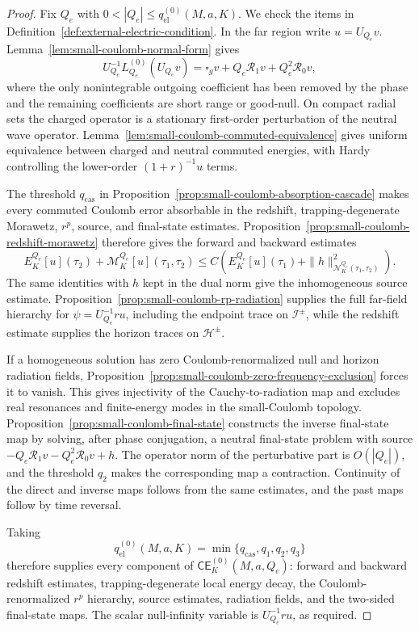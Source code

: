 \documentclass[11pt]{article}
\numberwithin{equation}{section}
\theoremstyle{plain}
\theoremstyle{definition}
\theoremstyle{remark}
\newcommand{\CElec}{\mathsf{CE}}
\begin{document}
\begin{proof}
Fix \(Q_e\) with \(0<|Q_e|\le q^{(0)}_{\mathrm{el}}(M,a,K)\).  We check the items in Definition~\ref{def:external-electric-condition}.  In the far region write \(u=U_{Q_e}v\).  Lemma~\ref{lem:small-coulomb-normal-form} gives
\begin{equation}
 U_{Q_e}^{-1}L_{Q_e}^{(0)}(U_{Q_e}v)=\square_gv+Q_e\mathcal R_1v+Q_e^2\mathcal R_0v,
\end{equation}
where the only nonintegrable outgoing coefficient has been removed by the phase and the remaining coefficients are short range or good-null.  On compact radial sets the charged operator is a stationary first-order perturbation of the neutral wave operator.  Lemma~\ref{lem:small-coulomb-commuted-equivalence} gives uniform equivalence between charged and neutral commuted energies, with Hardy controlling the lower-order \((1+r)^{-1}u\) terms.

The threshold \(q_{\mathrm{cas}}\) in Proposition~\ref{prop:small-coulomb-absorption-cascade} makes every commuted Coulomb error absorbable in the redshift, trapping-degenerate Morawetz, \(r^p\), source, and final-state estimates.  Proposition~\ref{prop:small-coulomb-redshift-morawetz} therefore gives the forward and backward estimates
\begin{equation}
 E^{Q_e}_K[u](\tau_2)+\mathcal M^{Q_e}_K[u](\tau_1,\tau_2)
 \le C\left(E^{Q_e}_K[u](\tau_1)+\|h\|_{\mathcal N^{Q_e}_K(\tau_1,\tau_2)}^2\right).
\end{equation}
The same identities with \(h\) kept in the dual norm give the inhomogeneous source estimate.  Proposition~\ref{prop:small-coulomb-rp-radiation} supplies the full far-field hierarchy for \(\psi=U_{Q_e}^{-1}ru\), including the endpoint trace on \(\mathcal I^\pm\), while the redshift estimate supplies the horizon traces on \(\mathcal H^\pm\).

If a homogeneous solution has zero Coulomb-renormalized null and horizon radiation fields, Proposition~\ref{prop:small-coulomb-zero-frequency-exclusion} forces it to vanish.  This gives injectivity of the Cauchy-to-radiation map and excludes real resonances and finite-energy modes in the small-Coulomb topology.  Proposition~\ref{prop:small-coulomb-final-state} constructs the inverse final-state map by solving, after phase conjugation, a neutral final-state problem with source \(-Q_e\mathcal R_1v-Q_e^2\mathcal R_0v+h\).  The operator norm of the perturbative part is \(O(|Q_e|)\), and the threshold \(q_2\) makes the corresponding map a contraction.  Continuity of the direct and inverse maps follows from the same estimates, and the past maps follow by time reversal.

Taking
\begin{equation}
 q^{(0)}_{\mathrm{el}}(M,a,K)=\min\{q_{\mathrm{cas}},q_1,q_2,q_3\}
\end{equation}
therefore supplies every component of \( \CElec_K^{(0)}(M,a,Q_e)\): forward and backward redshift estimates, trapping-degenerate local energy decay, the Coulomb-renormalized \(r^p\) hierarchy, source estimates, radiation fields, and the two-sided final-state maps.  The scalar null-infinity variable is \(U_{Q_e}^{-1}ru\), as required.
\end{proof}
\end{document}
